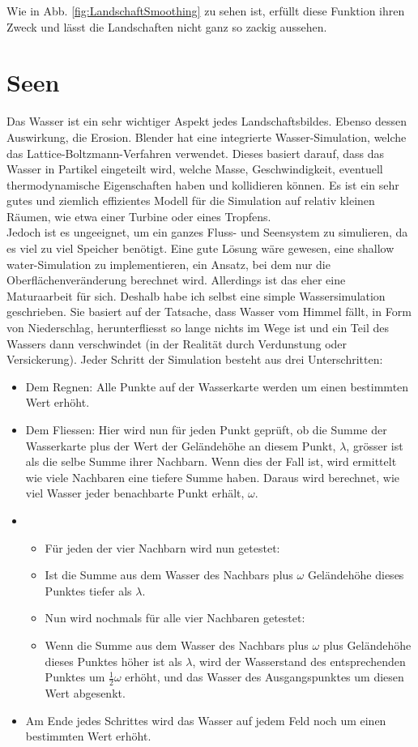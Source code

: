 \documentclass[12pt,twoside]{book}
\begin{document}
Wie in Abb. \ref{fig:LandschaftSmoothing} zu sehen ist, erf\"ullt diese Funktion ihren Zweck und l\"asst die Landschaften nicht ganz so zackig aussehen.

\section {Seen}
Das Wasser ist ein sehr wichtiger Aspekt jedes Landschaftsbildes. Ebenso dessen Auswirkung, die Erosion.
 Blender hat eine integrierte Wasser-Simulation, welche das Lattice-Boltzmann-Verfahren verwendet.
 Dieses basiert darauf, dass das Wasser in Partikel eingeteilt wird, welche Masse, Geschwindigkeit, eventuell thermodynamische Eigenschaften haben und kollidieren k\"onnen.
 Es ist ein sehr gutes und ziemlich effizientes Modell f\"ur die Simulation auf relativ kleinen R\"aumen, wie etwa einer Turbine oder eines Tropfens.\\
 Jedoch ist es ungeeignet, um ein ganzes Fluss- und Seensystem zu simulieren, da es viel zu viel Speicher ben\"otigt. 
 Eine gute L\"osung w\"are gewesen, eine \glqq shallow water\grqq -Simulation zu implementieren, ein Ansatz, bei dem nur die Oberfl\"achenver\"anderung berechnet wird.
 Allerdings ist das eher eine Maturaarbeit f\"ur sich.
 Deshalb habe ich selbst eine simple Wassersimulation geschrieben.
Sie basiert auf der Tatsache, dass Wasser vom Himmel f\"allt, in Form von Niederschlag, herunterfliesst so lange nichts im Wege ist und ein Teil des Wassers dann verschwindet (in der Realit\"at durch Verdunstung oder Versickerung).
Jeder Schritt der Simulation besteht aus drei Unterschritten:

\begin{itemize}
\itemsep0em
\item Dem Regnen: Alle Punkte auf der Wasserkarte werden um einen bestimmten Wert erh\"oht.
\item Dem Fliessen: Hier wird nun f\"ur jeden Punkt gepr\"uft, ob die Summe der Wasserkarte plus der Wert der Gel\"andeh\"ohe an diesem Punkt,{ }\( \lambda \), gr\"osser ist als die selbe Summe ihrer Nachbarn. Wenn dies der Fall ist, wird ermittelt wie viele Nachbaren eine tiefere Summe haben. Daraus wird berechnet, wie viel Wasser jeder benachbarte Punkt erh\"alt, \( \omega \).
\item \begin{itemize}
\item F\"ur jeden der vier Nachbarn wird nun getestet:
\item Ist die Summe aus dem Wasser des Nachbars plus \( \omega \){ }Gel\"andeh\"ohe dieses Punktes tiefer als \( \lambda \).
\item Nun wird nochmals f\"ur alle vier Nachbaren getestet:
\item Wenn die Summe aus dem Wasser des Nachbars plus \( \omega \){ }plus Gel\"andeh\"ohe dieses Punktes h\"oher ist als \( \lambda \), wird der Wasserstand des entsprechenden Punktes um \( \frac{1}{2}\omega \) erh\"oht, und das Wasser des Ausgangspunktes um diesen Wert abgesenkt.
\end{itemize}
\item Am Ende jedes Schrittes wird das Wasser auf jedem Feld noch um einen bestimmten Wert erh\"oht.
\end{itemize}
\end{document}
